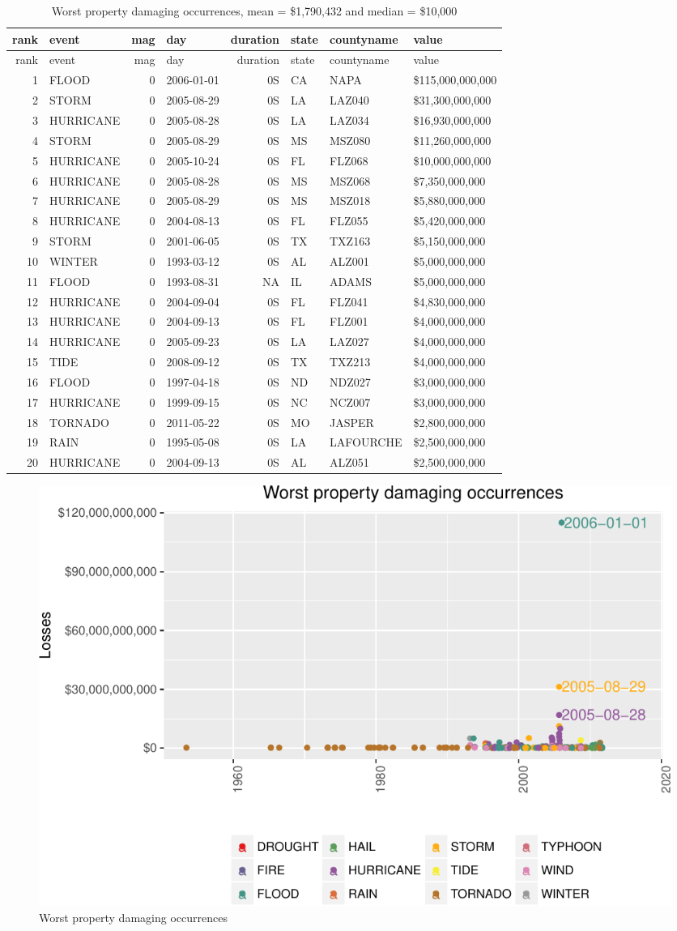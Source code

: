 \documentclass[]{article}
\begin{document}
\begin{longtable}[]{@{}rlrlrlll@{}}
\caption{Worst property damaging occurrences, mean = \$1,790,432 and
median = \$10,000}\tabularnewline
\toprule
rank & event & mag & day & duration & state & countyname &
value\tabularnewline
\midrule
\endfirsthead
\toprule
rank & event & mag & day & duration & state & countyname &
value\tabularnewline
\midrule
\endhead
1 & FLOOD & 0 & 2006-01-01 & 0S & CA & NAPA &
\$115,000,000,000\tabularnewline
2 & STORM & 0 & 2005-08-29 & 0S & LA & LAZ040 &
\$31,300,000,000\tabularnewline
3 & HURRICANE & 0 & 2005-08-28 & 0S & LA & LAZ034 &
\$16,930,000,000\tabularnewline
4 & STORM & 0 & 2005-08-29 & 0S & MS & MSZ080 &
\$11,260,000,000\tabularnewline
5 & HURRICANE & 0 & 2005-10-24 & 0S & FL & FLZ068 &
\$10,000,000,000\tabularnewline
6 & HURRICANE & 0 & 2005-08-28 & 0S & MS & MSZ068 &
\$7,350,000,000\tabularnewline
7 & HURRICANE & 0 & 2005-08-29 & 0S & MS & MSZ018 &
\$5,880,000,000\tabularnewline
8 & HURRICANE & 0 & 2004-08-13 & 0S & FL & FLZ055 &
\$5,420,000,000\tabularnewline
9 & STORM & 0 & 2001-06-05 & 0S & TX & TXZ163 &
\$5,150,000,000\tabularnewline
10 & WINTER & 0 & 1993-03-12 & 0S & AL & ALZ001 &
\$5,000,000,000\tabularnewline
11 & FLOOD & 0 & 1993-08-31 & NA & IL & ADAMS &
\$5,000,000,000\tabularnewline
12 & HURRICANE & 0 & 2004-09-04 & 0S & FL & FLZ041 &
\$4,830,000,000\tabularnewline
13 & HURRICANE & 0 & 2004-09-13 & 0S & FL & FLZ001 &
\$4,000,000,000\tabularnewline
14 & HURRICANE & 0 & 2005-09-23 & 0S & LA & LAZ027 &
\$4,000,000,000\tabularnewline
15 & TIDE & 0 & 2008-09-12 & 0S & TX & TXZ213 &
\$4,000,000,000\tabularnewline
16 & FLOOD & 0 & 1997-04-18 & 0S & ND & NDZ027 &
\$3,000,000,000\tabularnewline
17 & HURRICANE & 0 & 1999-09-15 & 0S & NC & NCZ007 &
\$3,000,000,000\tabularnewline
18 & TORNADO & 0 & 2011-05-22 & 0S & MO & JASPER &
\$2,800,000,000\tabularnewline
19 & RAIN & 0 & 1995-05-08 & 0S & LA & LAFOURCHE &
\$2,500,000,000\tabularnewline
20 & HURRICANE & 0 & 2004-09-13 & 0S & AL & ALZ051 &
\$2,500,000,000\tabularnewline
\bottomrule
\end{longtable}

\begin{figure}[h!]
\centering
\includegraphics{readme_files/figure-latex/prop-single-plot-1.pdf}
\caption{Worst property damaging occurrences}
\end{figure}
\end{document}
